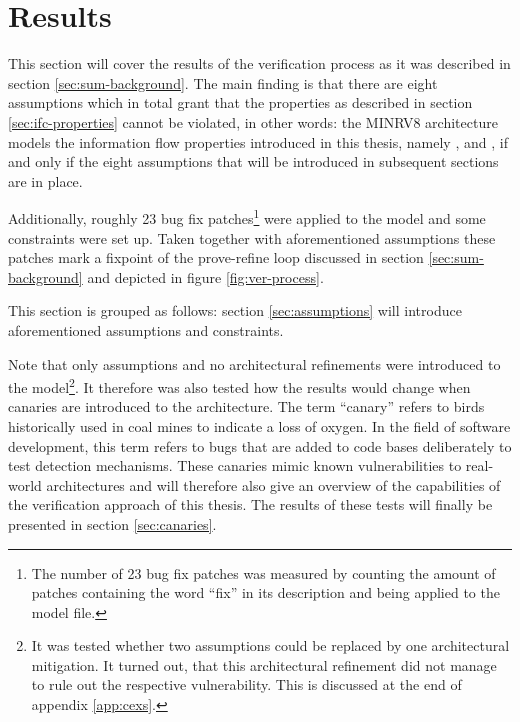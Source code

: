 
\chapter{Results}
\label{chp:results}

This section will cover the results of the verification process as it was described in section \ref{sec:sum-background}.
The main finding is that there are eight assumptions which in total grant that the properties as described in section \ref{sec:ifc-properties} cannot be violated, in other words: the MINRV8 architecture models the information flow properties introduced in this thesis, namely ,  and , if and only if the eight assumptions that will be introduced in subsequent sections are in place.

Additionally, roughly 23 bug fix patches\footnote{%
    The number of 23 bug fix patches was measured by counting the amount of patches containing the word \enquote{fix} in its description and being applied to the model file.
} were applied to the model and some  constraints were set up.
Taken together with aforementioned assumptions these patches mark a fixpoint of the prove-refine loop discussed in section \ref{sec:sum-background} and depicted in figure \ref{fig:ver-process}.

This section is grouped as follows: section \ref{sec:assumptions} will introduce aforementioned assumptions and  constraints.

Note that only assumptions and no architectural refinements were introduced to the model\footnote{%
    It was tested whether two assumptions could be replaced by one architectural mitigation.
    It turned out, that this architectural refinement did not manage to rule out the respective vulnerability.
    This is discussed at the end of appendix \ref{app:cexs}.
}.
It therefore was also tested how the results would change when canaries are introduced to the architecture.
The term \enquote{canary} refers to birds historically used in coal mines to indicate a loss of oxygen.
In the field of software development, this term refers to bugs that are added to code bases deliberately to test detection mechanisms.
These canaries mimic known vulnerabilities to real-world architectures and will therefore also give an overview of the capabilities of the verification approach of this thesis.
The results of these tests will finally be presented in section \ref{sec:canaries}.

